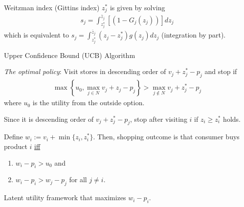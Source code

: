 \documentclass[11pt]{elegantbook}
\begin{document}
\begin{definition}
    Weitzman index (Gittins index) $z_j^*$ is given by solving
    \begin{equation}
        \begin{aligned}
            s_j=\int_{z_j^*}^{\bar{z}_j}[(1-G_j(z_j))]dz_j
        \end{aligned}
        \nonumber
    \end{equation}
    which is equivalent to $s_j=\int_{z_j^*}^{\bar{z}_j}(z_j-z_j^*)g(z_j) dz_j$ (integration by part).
\end{definition}
\begin{remark}
    Upper Confidence Bound (UCB) Algorithm
\end{remark}
\begin{proposition}
    \textit{The optimal policy}: Visit stores in descending order of $v_j+z_j^*-p_j$ and stop if
    \begin{equation}
        \begin{aligned}
            \max\left\{u_0,\max_{j\in N}v_j+z_j-p_j\right\}>\max_{j\notin N} v_j+z_j^*-p_j
        \end{aligned}
        \nonumber
    \end{equation}
    where $u_0$ is the utility from the outside option.
    \begin{note}
        Since it is descending order of $v_j+z_j^*-p_j$, stop after visiting $i$ if $z_i\geq z_i^*$ holds.
    \end{note}

    Define $w_i:= v_i+\min\{z_i,z_i^*\}$. Then, shopping outcome is that consumer buys product $i$ \underline{iff}
    \begin{enumerate}
        \item $w_i-p_i>u_0$ and
        \item $w_i-p_i>w_j-p_j$ for all $j\neq i$.
    \end{enumerate}
    \begin{note}
        Latent utility framework that maximizes $w_i-p_i$.
    \end{note}
\end{proposition}
\end{document}

